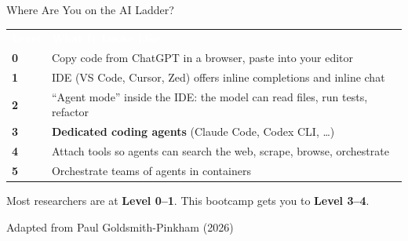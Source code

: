 \documentclass[aspectratio=169, 10pt]{beamer}
\begin{document}
\begin{frame}{Where Are You on the AI Ladder?}
\centering
\vskip2pt
{\small
\begin{tabular}{>{\centering\arraybackslash\bfseries}m{1cm} m{12cm}}
\rowcolor{SlateTeal}
\textcolor{white}{Level} & \centering\arraybackslash\textcolor{white}{\textbf{What It Looks Like}} \\[1pt]
\rowcolor{PaleSage}
\textcolor{SlateTeal}{0} & Copy code from ChatGPT in a browser, paste into your editor \\[1pt]
\rowcolor{white}
\textcolor{SlateTeal}{1} & IDE (VS Code, Cursor, Zed) offers inline completions and inline chat \\[1pt]
\rowcolor{PaleSage}
\textcolor{SlateTeal}{2} & ``Agent mode'' inside the IDE: the model can read files, run tests, refactor \\[1pt]
\rowcolor{white}
\textcolor{SlateTeal}{3} & \textbf{Dedicated coding agents} (Claude Code, Codex CLI, \ldots) \\[1pt]
\rowcolor{PaleSage}
\textcolor{SlateTeal}{4} & Attach tools so agents can search the web, scrape, browse, orchestrate \\[1pt]
\rowcolor{white}
\textcolor{SlateTeal}{5} & Orchestrate teams of agents in containers \\[1pt]
\end{tabular}
}
\vskip8pt
\pause
\begin{tcolorbox}[accentbox, width=10cm, halign=center]
\small Most researchers are at \textbf{Level 0--1}. This bootcamp gets you to \textbf{Level 3--4}.
\end{tcolorbox}
\vskip2pt
{\scriptsize\color{CoolGray} Adapted from Paul Goldsmith-Pinkham (2026)}
\end{frame}
\end{document}
